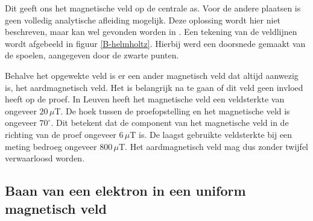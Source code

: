 Dit geeft ons het magnetische veld op de centrale as. Voor de andere plaatsen 
is geen volledig analytische afleiding mogelijk. Deze oplossing wordt hier niet 
beschreven, maar kan wel gevonden worden in \cite{magnVeldHelmholtz}.
Een tekening van de veldlijnen wordt afgebeeld in figuur \ref{B-helmholtz}.  
Hierbij werd een doorsnede gemaakt van de spoelen, aangegeven door de zwarte 
punten.


Behalve het opgewekte veld is er een ander magnetisch veld dat altijd aanwezig 
is, het aardmagnetisch veld. Het is belangrijk na te gaan of dit veld geen 
invloed heeft op de proef. In Leuven heeft het magnetische veld een veldsterkte 
van ongeveer $20\,\mu$T\cite{WMM}. De hoek tussen de proefopstelling en het 
magnetische veld is ongeveer $70^{\circ}$.  Dit betekent dat de component van 
het magnetische veld in de richting van de proef ongeveer 6\,$\mu$T is. De 
laagst gebruikte veldsterkte bij een meting bedroeg ongeveer 800\,$\mu$T. Het 
aardmagnetisch veld mag dus zonder twijfel verwaarloosd worden.

\subsection{Baan van een elektron in een uniform magnetisch veld}


